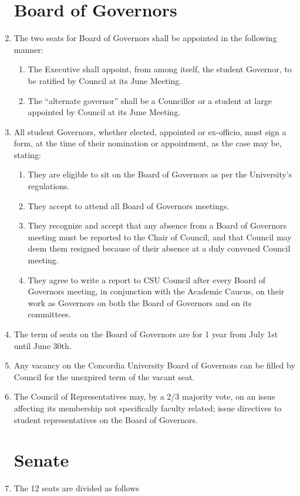\documentclass[oneside]{book}
\begin{document}
\begin{enumerate}
\chapter{\label{Board_of_Governors}Board of Governors }
\item The two seats for Board of Governors shall be appointed in the following
manner: 

\begin{enumerate}
\item The Executive shall appoint, from among itself, the student Governor,
to be ratified by Council at its June Meeting. 
\item The ``alternate governor'' shall be a Councillor or a student
at large appointed by Council at its June Meeting. 
\end{enumerate}
\item All student Governors, whether elected, appointed or ex-officio, must
sign a form, at the time of their nomination or appointment, as the
case may be, stating: 

\begin{enumerate}
\item They are eligible to sit on the Board of Governors as per the University's
regulations. 
\item They accept to attend all Board of Governors meetings. 
\item They recognize and accept that any absence from a Board of Governors
meeting must be reported to the Chair of Council, and that Council
may deem them resigned because of their absence at a duly convened
Council meeting. 
\item They agree to write a report to CSU Council after every Board of Governors
meeting, in conjunction with the Academic Caucus, on their work as
Governors on both the Board of Governors and on its committees. 
\end{enumerate}
\item The term of seats on the Board of Governors are for 1 year from July
1st until June 30th. 
\item Any vacancy on the Concordia University Board of Governors can be
filled by Council for the unexpired term of the vacant seat. 
\item The Council of Representatives may, by a 2/3 majority vote, on an
issue affecting its membership not specifically faculty related; issue
directives to student representatives on the Board of Governors. 

\chapter{\label{Senate}Senate }
\item The 12 seats are divided as follows 


\end{enumerate}
\end{document}
